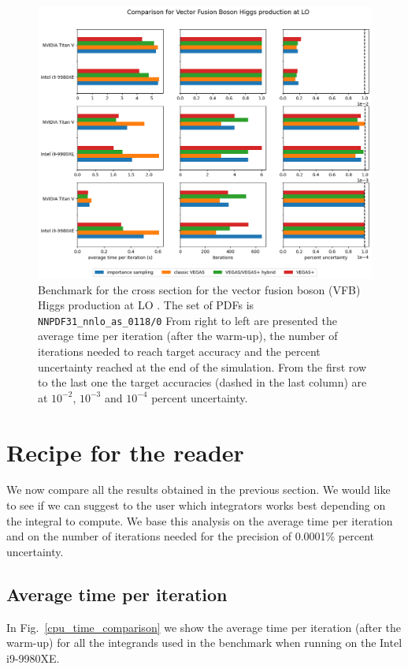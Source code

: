 \documentclass[../main/main.tex]{subfiles}
\begin{document}
\begin{figure}[h]
	\centering
	\includegraphics[width=\textwidth]{../images/higgs_LO_final.png}
	\caption{Benchmark  for the cross section for the vector fusion boson (VFB) Higgs production at LO \cite{Brucherseifer_2014}. The set of PDFs is \texttt{NNPDF31\_nnlo\_as\_0118/0} From right to left are presented the average time per iteration (after the warm-up), the number of iterations needed to reach target accuracy and the percent uncertainty reached at the end of the simulation. From the first row to the last one the target accuracies (dashed in the last column) are at $10^{-2}$, $10^{-3}$ and $10^{-4}$ percent uncertainty.}
	\label{higgs_plot}
\end{figure}

\section{Recipe for the reader}
We now compare all the results obtained in the previous section. We would like to see if we can suggest to the user which integrators works best depending on the integral to compute. We base this analysis on the average time per iteration and on the number of iterations needed for the precision of 0.0001\% percent uncertainty.

\subsection{Average time per iteration}
In Fig.~\ref{cpu_time_comparison} we show the average time per iteration (after the warm-up) for all the integrands used in the benchmark when running on the Intel i9-9980XE.
\end{document}

